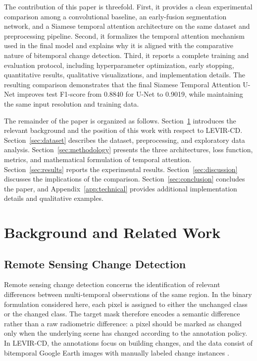 \documentclass[11pt,a4paper]{article}
\begin{document}
The contribution of this paper is threefold. First, it provides a clean experimental comparison among a convolutional baseline, an early-fusion segmentation network, and a Siamese temporal attention architecture on the same dataset and preprocessing pipeline. Second, it formalizes the temporal attention mechanism used in the final model and explains why it is aligned with the comparative nature of bitemporal change detection. Third, it reports a complete training and evaluation protocol, including hyperparameter optimization, early stopping, quantitative results, qualitative visualizations, and implementation details. The resulting comparison demonstrates that the final Siamese Temporal Attention U-Net improves test F1-score from 0.8840 for U-Net to 0.9019, while maintaining the same input resolution and training data.

The remainder of the paper is organized as follows. Section~\ref{sec:background} introduces the relevant background and the position of this work with respect to LEVIR-CD. Section~\ref{sec:dataset} describes the dataset, preprocessing, and exploratory data analysis. Section~\ref{sec:methodology} presents the three architectures, loss function, metrics, and mathematical formulation of temporal attention. Section~\ref{sec:results} reports the experimental results. Section~\ref{sec:discussion} discusses the implications of the comparison. Section~\ref{sec:conclusion} concludes the paper, and Appendix~\ref{app:technical} provides additional implementation details and qualitative examples.

\section{Background and Related Work}
\label{sec:background}

\subsection{Remote Sensing Change Detection}

Remote sensing change detection concerns the identification of relevant differences between multi-temporal observations of the same region. In the binary formulation considered here, each pixel is assigned to either the unchanged class or the changed class. The target mask therefore encodes a semantic difference rather than a raw radiometric difference: a pixel should be marked as changed only when the underlying scene has changed according to the annotation policy. In LEVIR-CD, the annotations focus on building changes, and the data consist of bitemporal Google Earth images with manually labeled change instances \cite{chen2020levir}.
\end{document}
